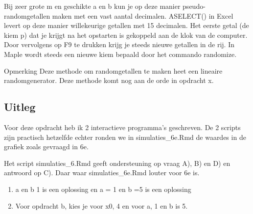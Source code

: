\documentclass{article}
\begin{document}
Bij zeer grote m en geschikte a en b kun je op deze manier pseudo-randomgetallen maken met een vast aantal decimalen. ASELECT() in Excel levert op deze manier willekeurige getallen met 15 decimalen. Het eerste getal (de kiem p) dat je krijgt na het opstarten is gekoppeld aan de klok van de computer. Door vervolgens op F9 te drukken krijg je steeds nieuwe getallen in de rij. 
In Maple wordt steeds een nieuwe kiem bepaald door het commando randomize. 
 
Opmerking 
Deze methode om randomgetallen te maken heet een lineaire randomgenerator. Deze methode komt nog aan de orde in opdracht x.

\newpage
\subsection{Uitleg}
\label{subsec:sample_uitv}
Voor deze opdracht heb ik 2 interactieve programma's geschreven. De 2 scripts zijn practisch hetzelfde echter ronden we in simulaties\_6e.Rmd de waardes in de grafiek zoals gevraagd in 6e.

Het script simulaties\_6.Rmd geeft ondersteuning op vraag A), B) en D) en antwoord op C). Daar waar simulaties\_6e.Rmd louter voor 6e is.

\begin{enumerate}[label=(\Alph*)]
\item a en b 1 is een oplossing en a = 1 en b =5 is een oplossing
\item Voor opdracht b, kies je voor x0, 4 en voor a, 1 en b is 5.
\end{enumerate}
\end{document}
